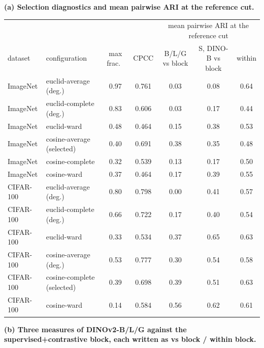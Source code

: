\begin{table}[H]
\centering
\scriptsize
\setlength{\tabcolsep}{3pt}
\begingroup
\noindent\textbf{(a) Selection diagnostics and mean pairwise ARI at the reference cut.}\par\vspace{1.5pt}
\setlength{\tabcolsep}{3pt}
\begin{tabular}{llcc|ccc}
\toprule
 & & & & \multicolumn{3}{c}{mean pairwise ARI at the reference cut} \\
dataset & configuration & max frac.\ & CPCC & B/L/G vs block & S, DINO-B vs block & within \\
\midrule
ImageNet & euclid-average (deg.) & 0.97 & 0.761 & 0.03 & 0.08 & 0.64 \\
ImageNet & euclid-complete (deg.) & 0.83 & 0.606 & 0.03 & 0.17 & 0.44 \\
ImageNet & euclid-ward & 0.48 & 0.464 & 0.15 & 0.38 & 0.53 \\
ImageNet & cosine-average (selected) & 0.40 & 0.691 & 0.38 & 0.35 & 0.48 \\
ImageNet & cosine-complete & 0.32 & 0.539 & 0.13 & 0.17 & 0.50 \\
ImageNet & cosine-ward & 0.37 & 0.464 & 0.17 & 0.39 & 0.55 \\
\midrule
CIFAR-100 & euclid-average (deg.) & 0.80 & 0.798 & 0.00 & 0.41 & 0.57 \\
CIFAR-100 & euclid-complete (deg.) & 0.66 & 0.722 & 0.17 & 0.40 & 0.54 \\
CIFAR-100 & euclid-ward & 0.33 & 0.534 & 0.37 & 0.65 & 0.63 \\
CIFAR-100 & cosine-average (deg.) & 0.53 & 0.777 & 0.30 & 0.54 & 0.58 \\
CIFAR-100 & cosine-complete (selected) & 0.39 & 0.698 & 0.39 & 0.51 & 0.63 \\
CIFAR-100 & cosine-ward & 0.14 & 0.584 & 0.56 & 0.62 & 0.61 \\
\bottomrule
\end{tabular}
\par\vspace{5pt}
\endgroup
\begingroup
\noindent\textbf{(b) Three measures of DINOv2-B/L/G against the supervised+contrastive block, each written as vs block / within block.}\par\vspace{1.5pt}

\end{table}

